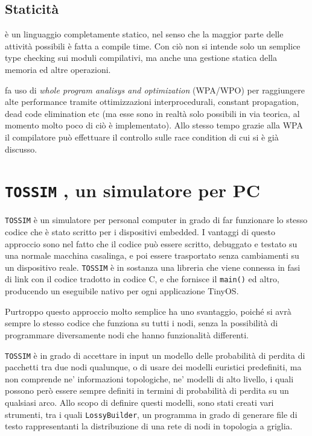 \documentclass[twoside,11pt,a4paper,italian,openany]{book}
\begin{document}



\subsection{Staticità}

\nesc è un linguaggio completamente statico, nel senso che la maggior parte delle attività 
possibili è fatta a compile time. Con ciò non si intende solo un semplice type checking sui 
moduli compilativi, ma anche una gestione statica della memoria ed altre operazioni. 


\nesc fa uso di \emph{whole program analisys and optimization} (WPA/WPO) per raggiungere alte
performance tramite ottimizzazioni interprocedurali, constant propagation, dead code 
elimination etc (ma esse sono in realtà solo possibili in via teorica, 
al momento molto poco di ciò è implementato).
Allo stesso tempo grazie alla WPA il compilatore può effettuare il controllo sulle race condition
di cui si è già discusso. 


\newcommand{\tos}{\texttt{TOSSIM} }

\section{\tos, un simulatore per PC}
\tos\cite{TOSSIM} è un simulatore per personal computer  in grado di far funzionare lo 
stesso codice \nesc che è stato scritto per i dispositivi embedded. 
I vantaggi di questo approccio sono nel fatto che il codice può essere scritto, 
debuggato e testato su una normale macchina casalinga, e poi essere trasportato 
senza cambiamenti su un dispositivo reale. 
\tos è in sostanza una libreria che viene connessa in fasi di link con il codice \nesc 
tradotto in codice C, e che fornisce il \texttt{main()} ed altro, producendo un 
eseguibile nativo per ogni applicazione TinyOS.

Purtroppo questo approccio molto semplice ha uno svantaggio, poiché si avrà sempre 
lo stesso codice che funziona su tutti i nodi, senza la possibilità di programmare diversamente nodi che hanno funzionalità differenti. 

\tos è in grado di accettare in input un modello delle probabilità di perdita di pacchetti 
tra due nodi qualunque, o di usare dei modelli euristici predefiniti, ma non comprende ne' 
informazioni topologiche, ne' modelli di alto livello, i quali possono però essere sempre 
definiti in termini di probabilità di perdita su un qualsiasi arco.
\newcommand{\tv}{\texttt{TinyViz}}
Allo scopo di definire questi modelli, sono stati creati vari strumenti, tra i quali 
\texttt{LossyBuilder}, un programma in grado di generare file di testo rappresentanti 
la distribuzione di una rete di nodi in topologia a griglia.
\end{document}

